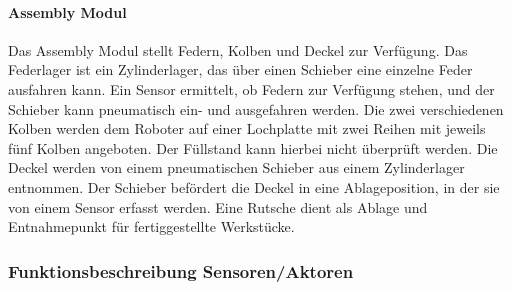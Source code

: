 \documentclass[11pt,a4paper,ngerman]{article}
\begin{document}
\paragraph{Assembly Modul}
Das Assembly Modul stellt Federn, Kolben und Deckel zur Verfügung. Das Federlager ist ein Zylinderlager, das über einen Schieber eine einzelne Feder ausfahren kann. Ein Sensor ermittelt, ob Federn zur Verfügung stehen, und der Schieber kann pneumatisch ein- und ausgefahren werden. Die zwei verschiedenen Kolben werden dem Roboter auf einer Lochplatte mit zwei Reihen mit jeweils fünf Kolben angeboten. Der Füllstand kann hierbei nicht überprüft werden. Die Deckel werden von einem pneumatischen Schieber aus einem Zylinderlager entnommen. Der Schieber befördert die Deckel in eine Ablageposition, in der sie von einem Sensor erfasst werden. Eine Rutsche dient als Ablage und Entnahmepunkt für fertiggestellte Werkstücke.

\subsubsection{Funktionsbeschreibung Sensoren/Aktoren}
\end{document}
